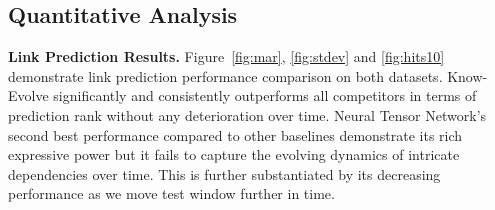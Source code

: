 \documentclass{article}
\begin{document}
%

\vspace{-0.3cm}
\subsection{Quantitative Analysis}

{\bf Link Prediction Results.} Figure~\ref{fig:mar}, \ref{fig:stdev} and \ref{fig:hits10} demonstrate link prediction performance comparison on both datasets. Know-Evolve significantly and consistently outperforms all competitors in terms of prediction rank without any deterioration over time. Neural Tensor Network's second best performance compared to other baselines demonstrate its rich expressive power but it fails to capture the evolving dynamics of intricate dependencies over time. This is further substantiated by its decreasing performance as we move test window further in time. 
\end{document}
